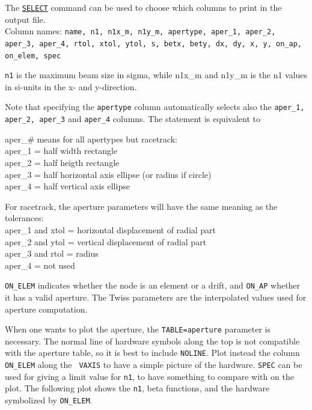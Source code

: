 The \hyperref[sec:select]{\tt SELECT} command can be  used to
choose which columns to print in the output file.   
\\ Column names: {\tt name, n1, n1x\_m, n1y\_m, apertype, aper\_1, aper\_2,
aper\_3, aper\_4, rtol, xtol, ytol, s, betx, bety, dx, dy, x, y, on\_ap,
on\_elem, spec}  

{\tt n1} is the maximum beam size in sigma, while n1x\_m and n1y\_m is the n1
values in si-units in the x- and y-direction.  

Note that specifying the {\tt apertype} column automatically selects also the
{\tt aper\_1, aper\_2, aper\_3} and {\tt aper\_4} columns. The statement
is equivalent to

aper\_\# means for all apertypes but racetrack:
\\ aper\_1 = half width rectangle
\\ aper\_2 = half heigth rectangle
\\ aper\_3 = half horizontal axis ellipse (or radius if circle)
\\ aper\_4 = half vertical axis ellipse

For racetrack, the aperture parameters will have the same meaning as the
tolerances: 
\\ aper\_1 and xtol = horizontal displacement of radial part 
\\ aper\_2 and ytol = vertical displacement of radial part 
\\ aper\_3 and rtol = radius 
\\ aper\_4 = not used 

{\tt ON\_ELEM} indicates whether the node is an element or a drift, and
{\tt ON\_AP} whether it has a valid aperture. The Twiss parameters are the
interpolated  values used for aperture computation.  

When one wants to plot the aperture, the {\tt TABLE=aperture} parameter
is necessary. The normal line of hardware symbols along the top is not
compatible with the aperture table, so it is best to include
{\tt NOLINE}. Plot instead the column {\tt ON\_ELEM} along the {\tt
  VAXIS} to have a simple picture of the hardware. {\tt SPEC} can be
used for giving a limit value for {\tt n1}, to have something to compare
with on the plot. The following plot shows the {\tt n1}, beta functions,
and the hardware symbolized by {\tt ON\_ELEM}.     

